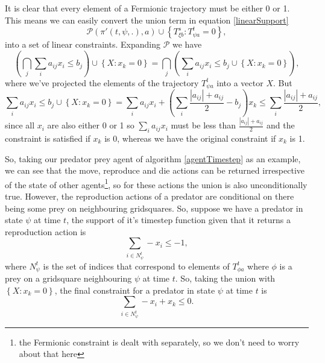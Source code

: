It is clear that every element of a Fermionic trajectory must be either 0 or 1. This means we can easily convert the union term in equation \ref{linearSupport} 
\[
\mathcal{P}(\pi'(t,\psi,.), a) \cup \left\{T^s_{\xi b}: T^t_{\psi a} = 0\right\},
\]
into a set of linear constraints. Expanding $\mathcal{P}$ we have
\[
\left(\bigcap_j \sum_i a_{ij}x_i \le b_j \right) \cup \left\{X: x_k = 0\right\} = \bigcap_j \left( \sum_i a_{ij}x_i \le b_j  \cup \left\{X: x_k = 0\right\}\right),
\]
where we've projected the elements of the trajectory $T^t_{\psi a}$ into a vector $X$. But
\[
\sum_i a_{ij}x_i \le b_j  \cup \left\{X: x_k = 0\right\} = \sum_i a_{ij}x_i + \left(\sum_i \frac{|a_{ij}| + a_{ij}}{2} - b_j\right)x_k \le \sum_i \frac{|a_{ij}| + a_{ij}}{2},
\]
since all $x_i$ are also either 0 or 1 so $\sum_i a_{ij}x_i$ must be less than $\frac{|a_{ij}| + a_{ij}}{2}$ and the constraint is satisfied if $x_k$ is 0, whereas we have the original constraint if $x_k$ is 1.

So, taking our predator prey agent of algorithm \ref{agentTimestep} as an example, we can see that the move, reproduce and die actions can be returned irrespective of the state of other agents\footnote{the Fermionic constraint is dealt with separately, so we don't need to worry about that here}, so for these actions the union is also unconditionally true. However, the reproduction actions of a predator are conditional on there being some prey on neighbouring gridsquares. So, suppose we have a predator in state $\psi$ at time $t$, the support of it's timestep function given that it returns a reproduction action is
\[
\sum_{i \in N^t_\psi} -x_i \le -1,
\]
where $N^t_\psi$ is the set of indices that correspond to elements of $T^t_{\phi a}$ where $\phi$ is a prey on a gridsquare neighbouring $\psi$ at time $t$. So, taking the union with $\left\{X: x_k = 0\right\}$, the final constraint for a predator in state $\psi$ at time $t$ is
\[
\sum_{i \in N^t_\psi} -x_i  + x_k  \le 0.
\]

